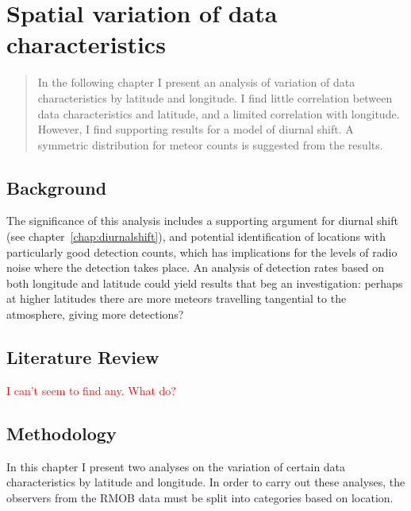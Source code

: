\chapter{Spatial variation of data characteristics}
\label{chap:spatial}
\begin{strip}
	\begin{minipage}{\textwidth}
		\begin{abstract}
			In the following chapter I present an analysis of variation of data characteristics by latitude and longitude. I find little correlation between data characteristics and latitude, and a limited correlation with longitude. However, I find supporting results for a model of diurnal shift. A symmetric distribution for meteor counts is suggested from the results.
		\end{abstract}
	\end{minipage}
\end{strip}
\section{Background}
The significance of this analysis includes a supporting argument for diurnal shift (see chapter~\ref{chap:diurnalshift}), and potential identification of locations with particularly good detection counts, which has implications for the levels of radio noise where the detection takes place. An analysis of detection rates based on both longitude and latitude could yield results that beg an investigation: perhaps at higher latitudes there are more meteors travelling tangential to the atmosphere, giving more detections?
\section{Literature Review}
\textcolor{red}{I can't seem to find any. What do?}
\section{Methodology}
In this chapter I present two analyses on the variation of certain data characteristics by latitude and longitude. In order to carry out these analyses, the observers from the RMOB data must be split into categories based on location.
